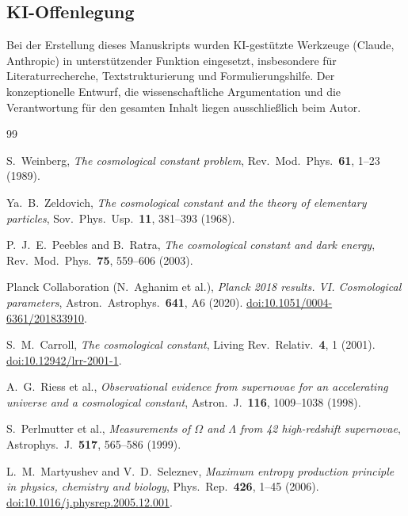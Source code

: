 \documentclass[12pt,a4paper]{article}
\theoremstyle{definition}
\theoremstyle{plain}
\theoremstyle{remark}
\begin{document}
\subsection*{KI-Offenlegung}
Bei der Erstellung dieses Manuskripts wurden KI-gest\"utzte Werkzeuge
(Claude, Anthropic) in unterst\"utzender Funktion eingesetzt,
insbesondere f\"ur Literaturrecherche, Textstrukturierung und
Formulierungshilfe. Der konzeptionelle Entwurf, die wissenschaftliche
Argumentation und die Verantwortung f\"ur den gesamten Inhalt liegen
ausschlie\ss lich beim Autor.

\begin{thebibliography}{99}

S.~Weinberg,
\textit{The cosmological constant problem},
Rev.\ Mod.\ Phys.\ \textbf{61}, 1--23 (1989).

Ya.~B.~Zeldovich,
\textit{The cosmological constant and the theory of elementary particles},
Sov.\ Phys.\ Usp.\ \textbf{11}, 381--393 (1968).

P.~J.~E.~Peebles and B.~Ratra,
\textit{The cosmological constant and dark energy},
Rev.\ Mod.\ Phys.\ \textbf{75}, 559--606 (2003).

Planck Collaboration (N.~Aghanim et al.),
\textit{Planck 2018 results. VI. Cosmological parameters},
Astron.\ Astrophys.\ \textbf{641}, A6 (2020).
\href{https://doi.org/10.1051/0004-6361/201833910}{doi:10.1051/0004-6361/201833910}.

S.~M.~Carroll,
\textit{The cosmological constant},
Living Rev.\ Relativ.\ \textbf{4}, 1 (2001).
\href{https://doi.org/10.12942/lrr-2001-1}{doi:10.12942/lrr-2001-1}.

A.~G.~Riess et al.,
\textit{Observational evidence from supernovae for an accelerating
universe and a cosmological constant},
Astron.\ J.\ \textbf{116}, 1009--1038 (1998).

S.~Perlmutter et al.,
\textit{Measurements of $\Omega$ and $\Lambda$ from 42 high-redshift
supernovae},
Astrophys.\ J.\ \textbf{517}, 565--586 (1999).

L.~M.~Martyushev and V.~D.~Seleznev,
\textit{Maximum entropy production principle in physics, chemistry and biology},
Phys.\ Rep.\ \textbf{426}, 1--45 (2006).
\href{https://doi.org/10.1016/j.physrep.2005.12.001}{doi:10.1016/j.physrep.2005.12.001}.


\end{thebibliography}
\end{document}
